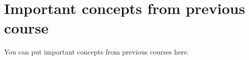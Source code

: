 \documentclass[../notes.tex]{subfile}
\begin{document}
\chapter{Important concepts from previous course}
You can put important concepts from previous courses here.
\end{document}
